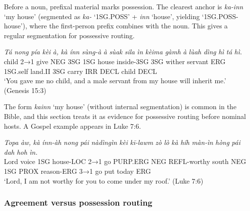 \documentclass[
  11pt,
  a4paper,
]{article}
\newcommand{\tdim}[1]{\textit{#1}}
\newcommand{\tdimword}[1]{\textit{#1}}
\renewcommand{\textsc}[1]{{\footnotesize\MakeUppercase{#1}}}
\newcommand{\glossquote}[1]{`#1'}
\begin{document}
Before a noun, prefixal material marks possession. The clearest anchor
is \tdim{ka-inn} \glossquote{my house} (segmented as \tdim{ka-}
\glossquote{1SG.POSS} + \tdim{inn} \glossquote{house}, yielding
\glossquote{1SG.POSS-house}), where the first-person prefix combines
with the noun. This gives a regular segmentation for possessive routing.

\begin{exe}
\ex \label{ex:pref-kainn-gen15}
\gll \tdimword{Tá} \tdimword{nong} \tdimword{pía} \tdimword{kèi} \tdimword{à,} \tdimword{kà} \tdimword{ínn} \tdimword{sùng-à} \tdimword{à} \tdimword{sùak} \tdimword{sila} \tdimword{ìn} \tdimword{kèima} \tdimword{gàmh} \tdimword{à} \tdimword{lùah} \tdimword{dìng} \tdimword{hì} \tdimword{tá} \tdimword{hì.} \\
     child \textsc{2→1} give \textsc{neg} \textsc{3sg} \textsc{1sg} house inside-\textsc{3sg} \textsc{3sg} wither servant \textsc{erg} \textsc{1sg}.self land.\textsc{ii} \textsc{3sg} carry \textsc{irr} \textsc{decl} child \textsc{decl} \\
\glt \glossquote{You gave me no child, and a male servant from my house will inherit me.} (Genesis 15:3)
\end{exe}

The form \tdim{kainn} \glossquote{my house} (without internal
segmentation) is common in the Bible, and this section treats it as
evidence for possessive routing before nominal hosts. A Gospel example
appears in Luke 7:6.

\begin{exe}
\ex \label{ex:pref-kainn-luke7}
\gll \tdimword{Topa} \tdimword{àw,} \tdimword{kà} \tdimword{ínn-àh} \tdimword{nong} \tdimword{pái} \tdimword{nàdìngìn} \tdimword{kèi} \tdimword{kī-lawm} \tdimword{zò} \tdimword{lò} \tdimword{kà} \tdimword{híh} \tdimword{màn-ìn} \tdimword{hòng} \tdimword{pái} \tdimword{dah} \tdimword{hoh} \tdimword{ìn.} \\
     Lord voice \textsc{1sg} house-\textsc{loc} \textsc{2→1} go \textsc{purp}.\textsc{erg} \textsc{neg} \textsc{refl}-worthy south \textsc{neg} \textsc{1sg} \textsc{prox} reason-\textsc{erg} \textsc{3→1} go put today \textsc{erg} \\
\glt \glossquote{Lord, I am not worthy for you to come under my roof.} (Luke 7:6)
\end{exe}

\subsubsection{Agreement versus possession
routing}\label{agreement-versus-possession-routing}
\end{document}
